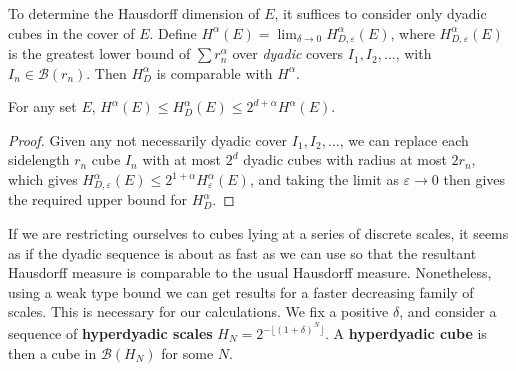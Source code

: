 To determine the Hausdorff dimension of $E$, it suffices to consider only dyadic cubes in the cover of $E$. Define $H^\alpha(E) = \lim_{\delta \to 0} H^\alpha_{D,\varepsilon}(E)$, where $H^\alpha_{D,\varepsilon}(E)$ is the greatest lower bound of $\sum r_n^\alpha$ over {\it dyadic} covers $I_1, I_2, \dots$, with $I_n \in \mathcal{B}(r_n)$. Then $H^\alpha_D$ is comparable with $H^\alpha$.

\begin{theorem}
    For any set $E$, $H^\alpha(E) \leq H^\alpha_D(E) \leq 2^{d + \alpha} H^\alpha(E)$.
\end{theorem}
\begin{proof}
    Given any not necessarily dyadic cover $I_1, I_2, \dots$, we can replace each sidelength $r_n$ cube $I_n$ with at most $2^d$ dyadic cubes with radius at most $2r_n$, which gives $H^\alpha_{D,\varepsilon}(E) \leq 2^{1 + \alpha} H^\alpha_\varepsilon(E)$, and taking the limit as $\varepsilon \to 0$ then gives the required upper bound for $H^\alpha_D$.
\end{proof}

If we are restricting ourselves to cubes lying at a series of discrete scales, it seems as if the dyadic sequence is about as fast as we can use so that the resultant Hausdorff measure is comparable to the usual Hausdorff measure. Nonetheless, using a weak type bound we can get results for a faster decreasing family of scales. This is necessary for our calculations. We fix a positive $\delta$, and consider a sequence of {\bf hyperdyadic scales} $H_N = 2^{- \lfloor (1 + \delta)^N \rfloor}$. A {\bf hyperdyadic cube} is then a cube in $\mathcal{B}(H_N)$ for some $N$.


